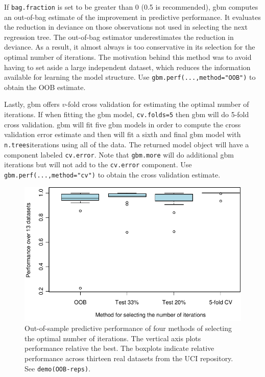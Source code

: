 \documentclass{article}
\begin{document}
If \texttt{bag.fraction} is set to be greater than 0 (0.5 is recommended), gbm computes an out-of-bag estimate of the improvement in predictive performance. It evaluates the reduction in deviance on those observations not used in selecting the next regression tree. The out-of-bag estimator underestimates the reduction in deviance. As a result, it almost always is too conservative in its selection for the optimal number of iterations. The motivation behind this method was to avoid having to set aside a large independent dataset, which reduces the information available for learning the model structure. Use \texttt{gbm.perf(...,method="OOB")} to obtain the OOB estimate.

Lastly, gbm offers $v$-fold cross validation for estimating the optimal number of iterations. If when fitting the gbm model, \texttt{cv.folds=5} then gbm will do 5-fold cross validation. gbm will fit five gbm models in order to compute the cross validation error estimate and then will fit a sixth and final gbm model with \texttt{n.trees}iterations using all of the data. The returned model object will have a component labeled \texttt{cv.error}. Note that \texttt{gbm.more} will do additional gbm iterations but will not add to the \texttt{cv.error} component. Use \texttt{gbm.perf(...,method="cv")} to obtain the cross validation estimate.

\begin{figure}[ht]
\begin{center}
\includegraphics[width=5in]{oobperf2}
\end{center}
\caption{Out-of-sample predictive performance of four methods of selecting the optimal number of iterations. The vertical axis plots performance relative the best. The boxplots indicate relative performance across thirteen real datasets from the UCI repository. See \texttt{demo(OOB-reps)}.}
\label{fig:oobperf}
\end{figure}
\end{document}
